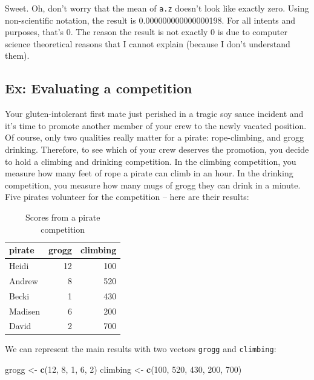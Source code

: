 \documentclass[]{book}
\newenvironment{Shaded}{\begin{snugshade}}{\end{snugshade}}
\newcommand{\KeywordTok}[1]{\textcolor[rgb]{0.13,0.29,0.53}{\textbf{#1}}}
\newcommand{\DecValTok}[1]{\textcolor[rgb]{0.00,0.00,0.81}{#1}}
\newcommand{\StringTok}[1]{\textcolor[rgb]{0.31,0.60,0.02}{#1}}
\newcommand{\NormalTok}[1]{#1}
\theoremstyle{definition}
\theoremstyle{definition}
\theoremstyle{remark}
\begin{document}
Sweet. Oh, don't worry that the mean of \texttt{a.z} doesn't look like
exactly zero. Using non-scientific notation, the result is
0.000000000000000198. For all intents and purposes, that's 0. The reason
the result is not exactly 0 is due to computer science theoretical
reasons that I cannot explain (because I don't understand them).

\subsection{Ex: Evaluating a
competition}\label{ex-evaluating-a-competition}

Your gluten-intolerant first mate just perished in a tragic soy sauce
incident and it's time to promote another member of your crew to the
newly vacated position. Of course, only two qualities really matter for
a pirate: rope-climbing, and grogg drinking. Therefore, to see which of
your crew deserves the promotion, you decide to hold a climbing and
drinking competition. In the climbing competition, you measure how many
feet of rope a pirate can climb in an hour. In the drinking competition,
you measure how many mugs of grogg they can drink in a minute. Five
pirates volunteer for the competition -- here are their results:

\begin{table}

\caption{\label{tab:unnamed-chunk-136}Scores from a pirate competition}
\centering
\begin{tabular}[t]{l|r|r}
\hline
pirate & grogg & climbing\\
\hline
Heidi & 12 & 100\\
\hline
Andrew & 8 & 520\\
\hline
Becki & 1 & 430\\
\hline
Madisen & 6 & 200\\
\hline
David & 2 & 700\\
\hline
\end{tabular}
\end{table}

We can represent the main results with two vectors \texttt{grogg} and
\texttt{climbing}:

\begin{Shaded}
\begin{Highlighting}[]
\NormalTok{grogg <-}\StringTok{ }\KeywordTok{c}\NormalTok{(}\DecValTok{12}\NormalTok{, }\DecValTok{8}\NormalTok{, }\DecValTok{1}\NormalTok{, }\DecValTok{6}\NormalTok{, }\DecValTok{2}\NormalTok{)}
\NormalTok{climbing <-}\StringTok{ }\KeywordTok{c}\NormalTok{(}\DecValTok{100}\NormalTok{, }\DecValTok{520}\NormalTok{, }\DecValTok{430}\NormalTok{, }\DecValTok{200}\NormalTok{, }\DecValTok{700}\NormalTok{)}
\end{Highlighting}
\end{Shaded}
\end{document}
